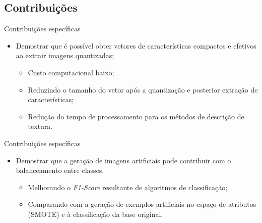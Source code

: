 \documentclass{beamer}
\begin{document}
\subsection{Contribuições}
%
\begin{frame}{Contribuições específicas}
  \setlength\leftmargini{1em}
  \justifying
  \begin{itemize}
    \item Demostrar que é possível obter vetores de características compactos e efetivos ao extrair imagens quantizadas;
    \begin{itemize}
      \item Custo computacional baixo;
      \item Reduzindo o tamanho do vetor após a quantização e posterior extração de características;
      \item Redução do tempo de processamento para os métodos de descrição de textura.
    \end{itemize}
  \end{itemize}
\end{frame}
\begin{frame}{Contribuições específicas}
  \setlength\leftmargini{1em}
  \justifying
  \begin{itemize}
    \item Demostrar que a geração de imagens artificiais pode contribuir com o balanceamento entre classes.
    \begin{itemize}
      \item Melhorando o \textit{F1-Score} resultante de algoritmos de classificação;
      \item Comparando com a geração de exemplos artificiais no espaço de atributos (SMOTE) e à classificação da base original.
    \end{itemize}
  \end{itemize}
\end{frame}
\end{document}

